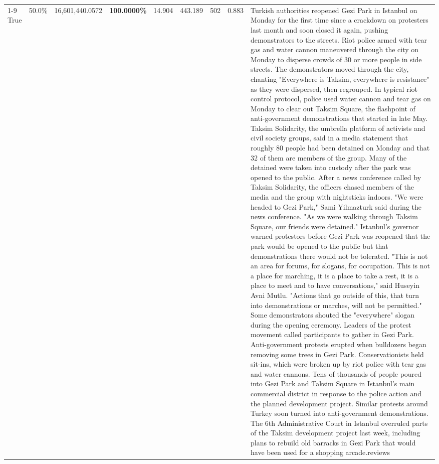 \begin{table}[H]
\begin{tabular}{lllrlllll}
\cline{1-9}
True & 50.0\% & 16,601,440.0572 & \bfseries \color{red} 100.0000\% & 14.904 & 443.189 & 502 & 0.883 & Turkish authorities reopened Gezi Park in Istanbul on Monday for the first time since a crackdown on protesters last month and soon closed it again, pushing demonstrators to the streets. Riot police armed with tear gas and water cannon maneuvered through the city on Monday to disperse crowds of 30 or more people in side streets. The demonstrators moved through the city, chanting "Everywhere is Taksim, everywhere is resistance" as they were dispersed, then regrouped. In typical riot control protocol, police used water cannon and tear gas on Monday to clear out Taksim Square, the flashpoint of anti-government demonstrations that started in late May. Taksim Solidarity, the umbrella platform of activists and civil society groups, said in a media statement that roughly 80 people had been detained on Monday and that 32 of them are members of the group. Many of the detained were taken into custody after the park was opened to the public. After a news conference called by Taksim Solidarity, the officers chased members of the media and the group with nightsticks indoors. "We were headed to Gezi Park," Sami Yilmazturk said during the news conference. "As we were walking through Taksim Square, our friends were detained." Istanbul's governor warned protestors before Gezi Park was reopened that the park would be opened to the public but that demonstrations there would not be tolerated. "This is not an area for forums, for slogans, for occupation. This is not a place for marching, it is a place to take a rest, it is a place to meet and to have conversations," said Huseyin Avni Mutlu. "Actions that go outside of this, that turn into demonstrations or marches, will not be permitted." Some demonstrators shouted the "everywhere" slogan during the opening ceremony. Leaders of the protest movement called participants to gather in Gezi Park. Anti-government protests erupted when bulldozers began removing some trees in Gezi Park. Conservationists held sit-ins, which were broken up by riot police with tear gas and water cannons. Tens of thousands of people poured into Gezi Park and Taksim Square in Istanbul's main commercial district in response to the police action and the planned development project. Similar protests around Turkey soon turned into anti-government demonstrations. The 6th Administrative Court in Istanbul overruled parts of the Taksim development project last week, including plans to rebuild old barracks in Gezi Park that would have been used for a shopping arcade.reviews \\

\end{tabular}
\end{table}
